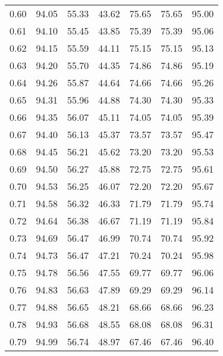 \begin{tabular}{|c|c|c|c|c|c|c|}
      0.60 &     94.05 &     55.33 &      43.62 &   75.65 &      75.65 &         95.00 \\
      0.61 &     94.10 &     55.45 &      43.85 &   75.39 &      75.39 &         95.06 \\
      0.62 &     94.15 &     55.59 &      44.11 &   75.15 &      75.15 &         95.13 \\
      0.63 &     94.20 &     55.70 &      44.35 &   74.86 &      74.86 &         95.19 \\
      0.64 &     94.26 &     55.87 &      44.64 &   74.66 &      74.66 &         95.26 \\
      0.65 &     94.31 &     55.96 &      44.88 &   74.30 &      74.30 &         95.33 \\
      0.66 &     94.35 &     56.07 &      45.11 &   74.05 &      74.05 &         95.39 \\
      0.67 &     94.40 &     56.13 &      45.37 &   73.57 &      73.57 &         95.47 \\
      0.68 &     94.45 &     56.21 &      45.62 &   73.20 &      73.20 &         95.53 \\
      0.69 &     94.50 &     56.27 &      45.88 &   72.75 &      72.75 &         95.61 \\
      0.70 &     94.53 &     56.25 &      46.07 &   72.20 &      72.20 &         95.67 \\
      0.71 &     94.58 &     56.32 &      46.33 &   71.79 &      71.79 &         95.74 \\
      0.72 &     94.64 &     56.38 &      46.67 &   71.19 &      71.19 &         95.84 \\
      0.73 &     94.69 &     56.47 &      46.99 &   70.74 &      70.74 &         95.92 \\
      0.74 &     94.73 &     56.47 &      47.21 &   70.24 &      70.24 &         95.98 \\
      0.75 &     94.78 &     56.56 &      47.55 &   69.77 &      69.77 &         96.06 \\
      0.76 &     94.83 &     56.63 &      47.89 &   69.29 &      69.29 &         96.14 \\
      0.77 &     94.88 &     56.65 &      48.21 &   68.66 &      68.66 &         96.23 \\
      0.78 &     94.93 &     56.68 &      48.55 &   68.08 &      68.08 &         96.31 \\
      0.79 &     94.99 &     56.74 &      48.97 &   67.46 &      67.46 &         96.40 \\

\end{tabular}
